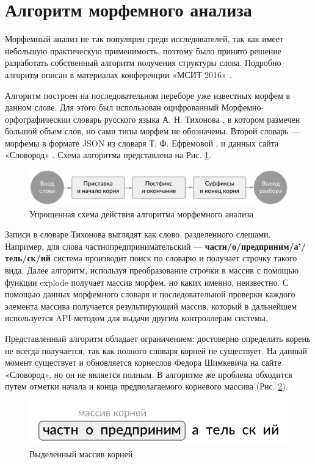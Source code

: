 \documentclass[a4paper,12pt]{article}
\begin{document}
\section{Алгоритм морфемного анализа}
Морфемный анализ не так популярен среди исследователей, так как имеет небольшую практическую применимость, поэтому было принято решение разработать собственный алгоритм получения структуры слова. Подробно алгоритм описан в материалах конференции «МСИТ 2016» \cite{msit}.

Алгоритм построен на последовательном переборе уже известных морфем в данном слове. Для этого был использован оцифрованный Морфемно-орфографическии словарь русского языка А. Н. Тихонова \cite{dicts}, в котором размечен большой объем слов, но сами типы морфем не обозначены. Второй словарь — морфемы в формате JSON из словаря Т. Ф. Ефремовой \cite{morph}, и данных сайта «Словород» \cite{slovorod}. Схема алгоритма представлена на Рис. \ref{fig:algo_scheme}.

\begin{figure}[ht!]
\centering
\includegraphics[scale=0.26]{algo_scheme}
\caption{Упрощенная схема действия алгоритма морфемного анализа}
\label{fig:algo_scheme}
\end{figure}

Записи в словаре Тихонова выглядят как слово, разделенного слешами. Например, для слова частнопредпринимательский — \textbf{частн/о/предприним/а'/тель/ск/ий} система производит поиск по словарю и получает строчку такого вида. Далее алгоритм, используя преобразование строчки в массив с помощью функции explode получает массив морфем, но каких именно, неизвестно. С помощью данных морфемного словаря и последовательной проверки каждого элемента массива получается результирующий массив, который в дальнейшем используется API-методом для выдачи другим контроллерам системы. 

Представленный алгоритм обладает ограничением: достоверно определить корень не всегда получается, так как полного словаря корней не существует. На данный момент существует и обновляется корнеслов Федора Шимкевича \cite{slovorod} на сайте «Словород», но он не является полным. В алгоритме же проблема обходится путем отметки начала и конца предполагаемого корневого массива (Рис. \ref{fig:root_array}).

\begin{figure}[ht!]
\centering
\includegraphics[scale=0.32]{root_array}
\caption{Выделенный массив корней}
\label{fig:root_array}
\end{figure}
\end{document}
